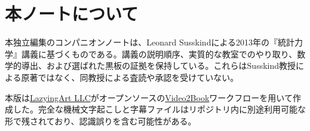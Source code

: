 \documentclass[11pt,oneside]{book}
\begin{document}
\frontmatter
\hypersetup{pageanchor=false}

\hypersetup{pageanchor=true}

\chapter*{本ノートについて}
本独立編集のコンパニオンノートは、Leonard Susskindによる2013年の『統計力学』講義に基づくものである。講義の説明順序、実質的な教室でのやり取り、数学的導出、および選ばれた黒板の証拠を保持している。これらはSusskind教授による原著ではなく、同教授による査読や承認を受けていない。

本版は\href{https://lazying.art}{LazyingArt LLC}がオープンソースの\href{https://github.com/lachlanchen/Video2Book}{Video2Book}ワークフローを用いて作成した。完全な機械文字起こしと字幕ファイルはリポジトリ内に別途利用可能な形で残されており、認識誤りを含む可能性がある。
\clearpage
\tableofcontents
\mainmatter










\end{document}
